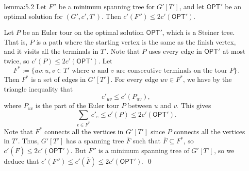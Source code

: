 \begin{lemma}{lemma:5.2}
    Let $F''$ be a minimum spanning tree for $G'[T']$, and let $\textsf{OPT}'$ be 
    an optimal solution for $(G', c', T')$. Then $c'(F'') \leq 2c'(\textsf{OPT}')$.
\end{lemma}\vspace{-0.25cm}
\begin{pf}
    Let $P$ be an Euler tour on the optimal solution $\textsf{OPT}'$, which is 
    a Steiner tree. That is, $P$ is a path where the starting vertex is 
    the same as the finish vertex, and it visits all the terminals in $T'$.
    Note that $P$ uses every edge in $\textsf{OPT}'$ at most twice, so 
    $c'(P) \leq 2c'(\textsf{OPT}')$. Let 
    \[ F^* := \{uv : u, v \in T' \text{ where } u \text{ and } v \text{ 
        are consecutive terminals on the tour $P$}\}. \] 
    Then $F^*$ is a set of edges in $G'[T']$. For every edge $uv \in F^*$, 
    we have by the triangle inequality that 
    \[ c'_{uv} \leq c'(P_{uv}), \] 
    where $P_{uv}$ is the part of the Euler tour 
    $P$ between $u$ and $v$. This gives 
    \[ \sum_{e\in F^*} c'_e \leq c'(P) \leq 2c'(\textsf{OPT}'). \] 
    Note that $F^*$ connects all the vertices in $G'[T']$ since $P$ connects 
    all the vertices in $T'$. Thus, $G'[T']$ has a spanning tree $\overline{F}$ 
    such that $\overline{F} \subseteq F^*$, so $c'(\overline{F}) \leq 
    2c'(\textsf{OPT}')$. But $F''$ is a minimum spanning tree of $G'[T']$, 
    so we deduce that $c'(F'') \leq c'(\overline{F}) \leq 2c'(\textsf{OPT}')$. \qed
\end{pf}